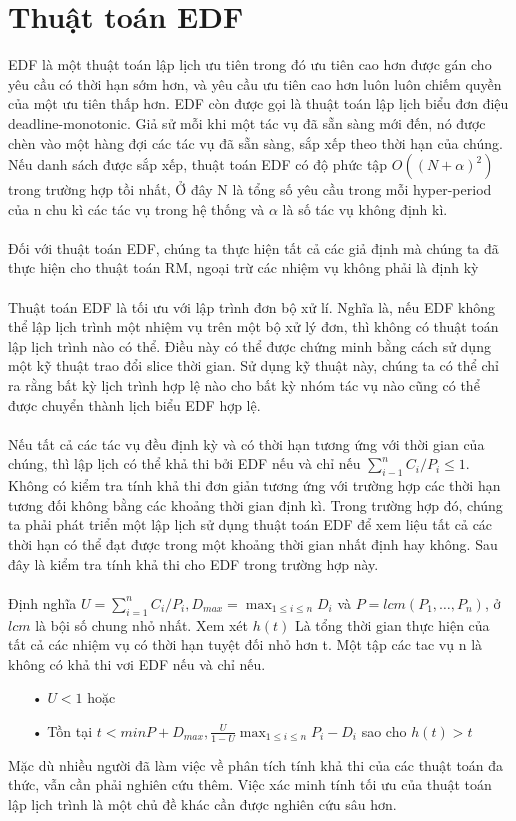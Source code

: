 \documentclass[a4paper,10pt]{report}
\begin{document}
\section{Thuật toán EDF}
EDF là một thuật toán lập lịch ưu tiên trong đó ưu tiên cao hơn được gán cho yêu cầu có thời hạn sớm hơn, và yêu cầu ưu tiên cao hơn luôn luôn chiếm quyền của một ưu tiên thấp hơn. EDF còn được gọi là thuật toán lập lịch biểu đơn điệu deadline-monotonic. Giả sử mỗi khi một tác vụ đã sẵn sàng mới đến, nó được chèn vào một hàng đợi các tác vụ đã sẵn sàng, sắp xếp theo thời hạn của chúng. Nếu danh sách được sắp xếp, thuật toán EDF có độ phức tập $O((N + \alpha)^2)$ trong trường hợp tồi nhất, Ở đây N là tổng số yêu cầu trong mỗi hyper-period của n chu kì các tác vụ trong hệ thống và $\alpha$ là số tác vụ không định kì. \\ \\
Đối với thuật toán EDF, chúng ta thực hiện tất cả các giả định mà chúng ta đã thực hiện cho thuật toán RM, ngoại trừ các nhiệm vụ không phải là định kỳ \\ \\
Thuật toán EDF là tối ưu với lập trình đơn bộ xử lí. Nghĩa là, nếu EDF không thể lập lịch trình một nhiệm vụ trên một bộ xử lý đơn, thì không có thuật toán lập lịch trình nào có thể. Điều này có thể được chứng minh bằng cách sử dụng một kỹ thuật trao đổi slice thời gian. Sử dụng kỹ thuật này, chúng ta có thể chỉ ra rằng bất kỳ lịch trình hợp lệ nào cho bất kỳ nhóm tác vụ nào cũng có thể được chuyển thành lịch biểu EDF hợp lệ.  \\ \\
Nếu tất cả các tác vụ đều định kỳ và có thời hạn tương ứng với thời gian của chúng, thì lập lịch có thể khả thi bởi EDF nếu và chỉ nếu $\sum_{i-1}^{n}C_i/P_i \leq 1$. Không có kiểm tra tính khả thi đơn giản tương ứng với trường hợp các thời hạn tương đối không bằng các khoảng thời gian định kì. Trong trường hợp đó, chúng ta phải phát triển một lập lịch sử dụng thuật toán EDF để xem liệu tất cả các thời hạn có thể đạt được trong một khoảng thời gian nhất định hay không. Sau đây là kiểm tra tính khả thi cho EDF trong trường hợp này. \\ \\
Định nghĩa $U = \sum_{i=1}^{n}C_i/P_i,D_{max} = \max_{1\leq i \leq n}{D_i}$ và $P =lcm(P_1, \ldots, P_n)$, ở $lcm$ là bội số chung nhỏ nhất. Xem xét $h(t)$ Là tổng thời gian thực hiện của tất cả các nhiệm vụ có thời hạn tuyệt đối nhỏ hơn t. Một tập các tac vụ n là không có khả thi vơi EDF nếu và chỉ nếu.
\begin{itemize}
\item[•] $U < 1$ hoặc
\item[•] Tồn tại $t < min{P + D_{max}, \frac{U}{1 - U}\max_{ 1\leq i \leq n}{P_i - D_i}}$ sao cho $h(t) > t$
\end{itemize}
Mặc dù nhiều người đã làm việc về phân tích tính khả thi của các thuật toán đa thức, vẫn cần phải nghiên cứu thêm. Việc xác minh tính tối ưu của thuật toán lập lịch trình là một chủ đề khác cần được nghiên cứu sâu hơn.
\end{document}
